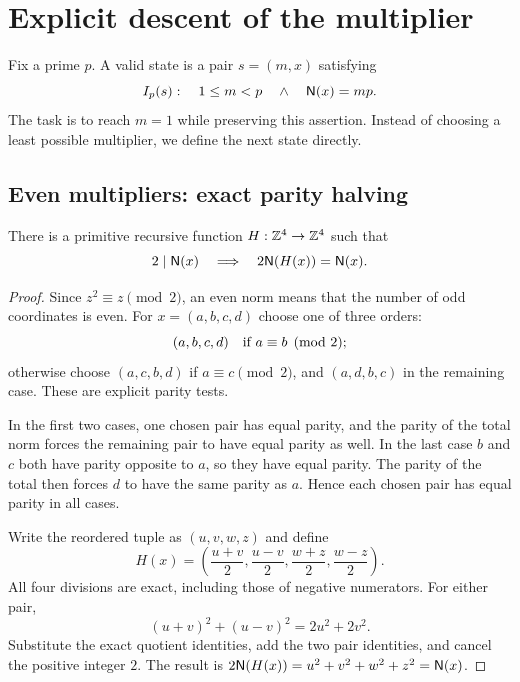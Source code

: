 \section{Explicit descent of the multiplier}
\label{sec:descent}

Fix a prime $p$. A valid state is a pair $s=(m,x)$ satisfying
\begin{equation}
\label{eq:valid}
 I_p(s):\quad 1\le m<p\quad\land\quad \mathsf N(x)=mp.
\end{equation}
The task is to reach $m=1$ while preserving this assertion. Instead of
choosing a least possible multiplier, we define the next state directly.

\subsection{Even multipliers: exact parity halving}

\begin{lemma}
\label{lem:half}
There is a primitive recursive function $H:\mathbb Z^4\to\mathbb Z^4$ such that
\[
 2\mid\mathsf N(x)\quad\Longrightarrow\quad 2\mathsf N(H(x))=\mathsf N(x).
\]
\end{lemma}

\begin{proof}
Since $z^2\equiv z\pmod2$, an even norm means that the number of odd
coordinates is even. For $x=(a,b,c,d)$ choose one of three orders:
\[
 (a,b,c,d)\quad\hbox{if }a\equiv b\pmod2;
\]
otherwise choose $(a,c,b,d)$ if $a\equiv c\pmod2$, and $(a,d,b,c)$ in the
remaining case. These are explicit parity tests.

In the first two cases, one chosen pair has equal parity, and the parity of
the total norm forces the remaining pair to have equal parity as well.
In the last case $b$ and $c$ both have parity opposite to $a$, so they
have equal parity. The parity of the total then forces $d$ to have the
same parity as $a$. Hence each chosen pair has equal parity in all cases.

Write the reordered tuple as $(u,v,w,z)$ and define
\begin{equation}
\label{eq:half}
 H(x)=\left(\frac{u+v}{2},\frac{u-v}{2},
              \frac{w+z}{2},\frac{w-z}{2}\right).
\end{equation}
All four divisions are exact, including those of negative numerators.
For either pair,
\[
 (u+v)^2+(u-v)^2=2u^2+2v^2.
\]
Substitute the exact quotient identities, add the two pair identities,
and cancel the positive integer $2$. The result is
$2\mathsf N(H(x))=u^2+v^2+w^2+z^2=\mathsf N(x)$.
\end{proof}

